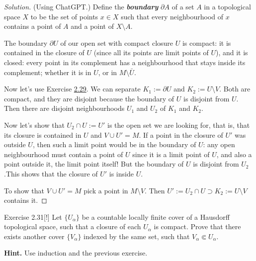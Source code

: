 \begin{proof}[Solution]\leavevmode
	(Using ChatGPT.) Define the \textit{\textbf{boundary}} \(\partial A\) of a set  \(A\) in a topological space \(X\) to be the set of points \(x \in X\) such that every neighbourhood of \(x\) contains a point of \(A\) and a point of \(X\setminus A\).

	The boundary \(\partial U\) of our open set with compact closure \(U\) is compact: it is contained in the closure of \(U\) (since all its points are limit points of \(U\)), and it is closed: every point in its complement has a neighbourhood that stays inside its complement; whether it is in \(U\), or in \(M\setminus \bar{U}\).

	Now let's use Exercise \hyperref[exer:2.29]{2.29}. We can separate \(K_1:=\partial U\) and \(K_2:=U \setminus V\). Both are compact, and they are disjoint because the boundary of \(U\) is disjoint from \(U\). Then there are disjoint neighbourhoods \(U_1\) and \(U_2\) of \(K_1\) and \(K_2\).

	Now let's show that \(U_2 \cap U:=U'\) is the open set we are looking for, that is, that its closure is contained in \(U\) and \(V \cup U'=M\). If a point in the closure of \(U'\) was outside \(U\), then such a limit point would be in the boundary of \(U\): any open neighbourhood must contain a point of \(U\) since it is a limit point of \(U\), and also a point outside it, the limit point itself! But the boundary of \(U\) is disjoint from  \(U_2\).This shows that the closure of \(U'\) is inside \(U\).

	To show that \(V \cup  U'=M\) pick a point in \(M \setminus V\). Then \(U':=U_2 \cap U\supset K_2:=U\setminus V\) contains it.
\end{proof}

\begin{thing4}{Exercise 2.31}[!]\label{exer:2.31}\leavevmode
Let \(\{U_\alpha\}\) be a countable locally finite cover of a Hausdorff topological space, such that a closure of each \(U_\alpha\) is compact. Prove that there exists another cover \(\{V_\alpha\}\) indexed by the same set, such that \(V_\alpha \Subset U_\alpha\).

\textbf{Hint.} Use induction and the previous exercise.
\end{thing4}

